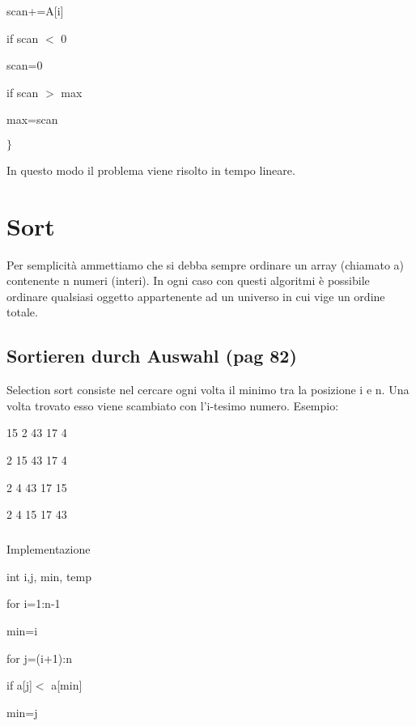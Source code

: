 \documentclass[12pt,a4paper]{book}
\begin{document}
	\hspace{2em}	scan+=A[i]

	\hspace{2em}	if scan $<$ 0

	\hspace{2em}\hspace{2em}		scan=0

	\hspace{2em}	if scan $>$ max 

	\hspace{2em}\hspace{2em}		max=scan

	$\}$			
	
In questo modo il problema viene risolto in tempo lineare.	
\chapter{Sort}
Per semplicità ammettiamo che si debba sempre ordinare un array (chiamato a) contenente n numeri (interi). In ogni caso con questi algoritmi è possibile ordinare qualsiasi oggetto appartenente ad un universo in cui vige un ordine totale.
\section{Sortieren durch Auswahl (pag 82)}
Selection sort consiste nel cercare ogni volta il minimo tra la posizione i e n. Una volta trovato esso viene scambiato con l'i-tesimo numero. Esempio:

15	2	43	17	4

2	15	43	17	4

2	4	43	17	15

2	4	15	17	43

\paragraph{}
Implementazione

int i,j, min, temp

for i=1:n-1

\hspace{2em} min=i

\hspace{2em} for j=(i+1):n

\hspace{2em} \hspace{2em} if a[j]$<$ a[min]

\hspace{2em}\hspace{2em} \hspace{2em} min=j
\end{document}
